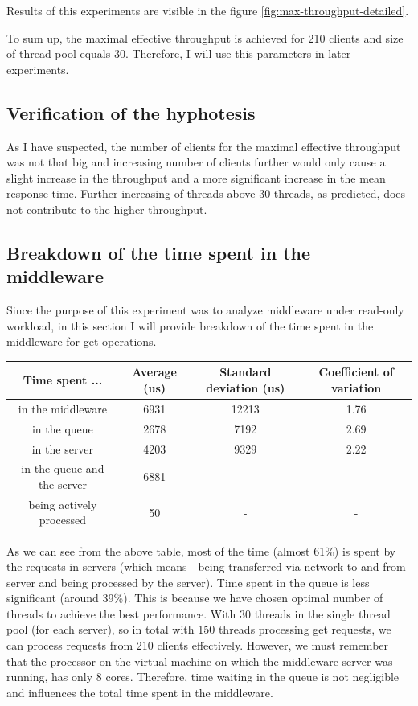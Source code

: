 \documentclass[11pt]{article}
\begin{document}
Results of this experiments are visible in the figure \ref{fig:max-throughput-detailed}.


To sum up, the maximal effective throughput is achieved for 210 clients and size of thread pool equals 30. Therefore, I will use this parameters in later experiments.  

\subsection{Verification of the hyphotesis}

As I have suspected, the number of clients for the maximal effective throughput was not that big and increasing number of clients further would only cause a slight increase in the throughput and a more significant increase in the mean response time. Further increasing of threads above 30 threads, as predicted, does not contribute to the higher throughput.

\subsection{Breakdown of the time spent in the middleware}
\label{sec:time-breakdown}

Since the purpose of this experiment was to analyze middleware under read-only workload, in this section I will provide breakdown of the time spent in the middleware for get operations.
\medskip

\begin{tabular}{|c|c|c|c|}
\hline \bf{Time spent ...} & \bf{Average (us)} & \bf{Standard deviation (us)} & \bf{Coefficient of variation} \\ 
\hline in the middleware & 6931 & 12213 & 1.76 \\
\hline in the queue & 2678 & 7192 & 2.69\\
\hline in the server & 4203 & 9329 & 2.22\\
\hline in the queue and the server & 6881 & - & -\\
\hline being actively processed & 50 & - & -\\
\hline
\end{tabular}
\medskip

As we can see from the above table, most of the time (almost 61\%) is spent by the requests in servers (which means - being transferred via network to and from server and being processed by the server). Time spent in the queue is less significant (around 39\%). This is because we have chosen optimal number of threads to achieve the best performance. With 30 threads in the single thread pool (for each server), so in total with 150 threads processing get requests, we can process requests from 210 clients effectively. However, we must remember that the processor on the virtual machine on which the middleware server was running, has only 8 cores. Therefore, time waiting in the queue is not negligible and influences the total time spent in the middleware.
\end{document}

